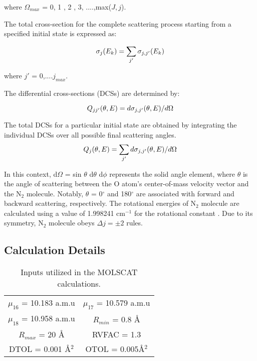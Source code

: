 \documentclass[fleqn,usenatbib]{mnras}
\begin{document}
where $\Omega_{max}$ = 0,  1 , 2 , 3, ....,max($J,j$).

The total cross-section for the complete scattering process starting from a specified initial state is expressed as:

\begin{equation}{\label{eq03}}
\sigma_{j}(E_k) = \sum_{j'}\sigma_{j,j'}(E_k)
\end{equation}

where $j'$ = 0,....$j_{max}$. 

The differential cross-sections (DCSs) are determined by:

\begin{equation}{\label{eq04}}
Q_{jj'}(\theta,E) = d\sigma_{j,j'}(\theta,E)/d\Omega
\end{equation}

The total DCSs for a particular initial state are obtained by integrating the individual DCSs over all possible final scattering angles.
 \begin{equation}{\label{eq05}}
Q_{j}(\theta,E) = \sum_{j'}d\sigma_{j,j'}(\theta,E)/d\Omega
\end{equation}

In this context, d$\Omega$ = sin $\theta$ d$\theta$ d$\phi$ represents the solid angle element, where $\theta$ is the angle of scattering between the O atom's center-of-mass velocity vector and the N$_2$ molecule. Notably, $\theta$ = 0$^{\circ}$ and 180$^{\circ}$ are associated with forward and backward scattering, respectively.
The rotational energies of N$_2$ molecule are calculated using a value of 1.998241 cm$^{-1}$ for the rotational constant \citep{doi:10.1063/1.2436891}. Due to its symmetry, N$_2$ molecule obeys ${\Delta j}= \pm 2$ rules.  

\subsection{Calculation Details}

\begin{table} %
\caption{\label{tab:table1}Inputs utilized in the MOLSCAT calculations.}
\begin{tabular}{cc}
\cline{1-2}
$\mu_{16}$ = 10.183 a.m.u     & $\mu_{17}$ = 10.579 a.m.u    \\
$\mu_{18}$ = 10.958 a.m.u     & $R_{min}$ = 0.8 {\AA}        \\
$R_{max}$ = 20 {\AA}          & RVFAC = 1.3                  \\
DTOL = 0.001 {\AA$^2$}        & OTOL = 0.005{\AA$^2$}        \\ \cline{1-2}     
\end{tabular}
\end{table}
\end{document}
